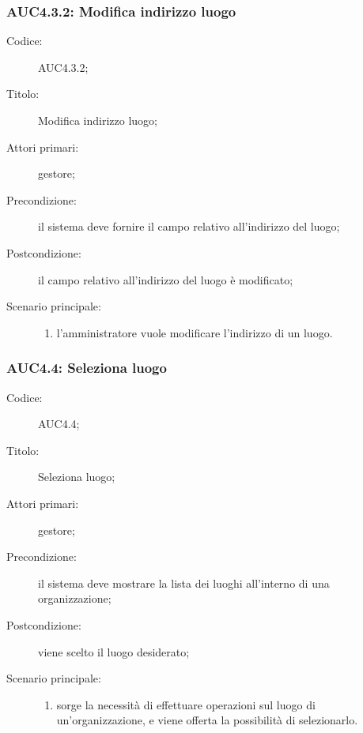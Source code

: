 \subsubsection{AUC4.3.2: Modifica indirizzo luogo}%
\label{subs:AUC4.3.2}
\begin{description}
  \item[Codice:] AUC4.3.2;
  \item[Titolo:] Modifica indirizzo luogo;
  \item[Attori primari:] gestore;
  \item[Precondizione:] il sistema deve fornire il campo relativo all'indirizzo del luogo;
  \item[Postcondizione:] il campo relativo all'indirizzo del luogo è modificato;
  \item[Scenario principale:]
  \begin{enumerate}
    \item l'amministratore vuole modificare l'indirizzo di un luogo.
  \end{enumerate}
\end{description}

\subsubsection{AUC4.4: Seleziona luogo}%
\label{subs:AUC4.4}
\begin{description}
  \item[Codice:] AUC4.4;
  \item[Titolo:] Seleziona luogo;
  \item[Attori primari:] gestore;
  \item[Precondizione:] il sistema deve mostrare la lista dei luoghi all'interno di una organizzazione;
  \item[Postcondizione:] viene scelto il luogo desiderato;
  \item[Scenario principale:]
  \begin{enumerate}
    \item sorge la necessità di effettuare operazioni sul luogo di un'organizzazione, e viene offerta la possibilità di selezionarlo.
  \end{enumerate}
\end{description}

